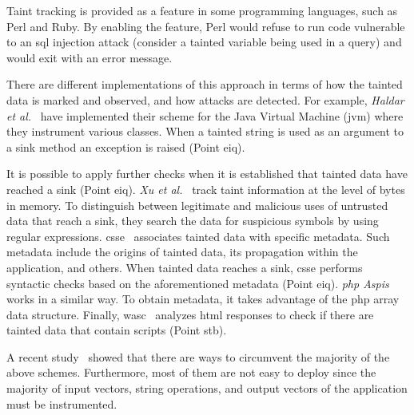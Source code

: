 \documentclass[conference]{IEEEtran}
\begin{document}
Taint tracking is provided as a feature in some programming languages,
such as Perl and Ruby. By enabling the feature, Perl would refuse to
run code vulnerable to an {\sc sql} injection attack (consider a
tainted variable being used in a query) and would exit with an error
message.

There are different implementations of this approach
in terms of how the tainted data is marked and observed,
and how attacks are detected.
For example, {\it Haldar et al.}~\cite{HCF05} have implemented
their scheme for the Java Virtual Machine ({\sc jvm})
where they instrument various classes. When a
tainted string is used as an argument to a sink method
an exception is raised (Point {\sc e}i{\sc q}).

It is possible to apply further checks when it is established that
tainted data have reached a sink (Point {\sc e}i{\sc q}). {\it Xu et
  al.}~\cite{XBS06} track taint information at the level of bytes in
memory. To distinguish between legitimate and malicious uses of
untrusted data that reach a sink, they search the data for suspicious
symbols by using regular expressions. {\sc csse}~\cite{PB05}
associates tainted data with specific metadata. Such metadata include
the origins of tainted data, its propagation within the application,
and others. When tainted data reaches a sink, {\sc csse} performs
syntactic checks based on the aforementioned metadata (Point {\sc e}i{\sc q}).
{\it {\sc php} Aspis}~\cite{PMP11} works in a similar way. To obtain
metadata, it takes advantage of the  {\sc php} array data structure.
Finally, {\sc wasc}~\cite{NLC07} analyzes {\sc html} responses to check
if there are tainted data that contain scripts (Point {\sc s}t{\sc b}).

A recent study~\cite{NBR14} showed that there are ways to circumvent
the majority of the above schemes. Furthermore, most of them are not
easy to deploy since the majority of input vectors, string operations,
and output vectors of the application must be instrumented.
\end{document}
